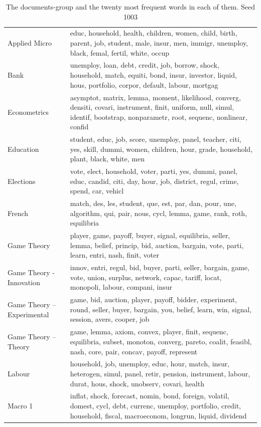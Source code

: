 \begin{table}[tb]
\caption[Groups]{The documents-group and the twenty most frequent words in each of them. Seed 1003}
\label{tab:groups}
\begin{tabularx}{\hsize}{lY}
\toprule
\midrule
Applied Micro & educ, household, health, children, women, child, birth, parent, job, student, male, insur, men, immigr, unemploy, black, femal, fertil, white, occup \\
Bank & unemploy, loan, debt, credit, job, borrow, shock, household, match, equiti, bond, insur, investor, liquid, hous, portfolio, corpor, default, labour, mortgag \\
Econometrics & asymptot, matrix, lemma, moment, likelihood, converg, densiti, covari, instrument, finit, uniform, null, simul, identif, bootstrap, nonparametr, root, sequenc, nonlinear, confid \\
Education & student, educ, job, score, unemploy, panel, teacher, citi, yes, skill, dummi, women, children, hour, grade, household, plant, black, white, men \\
Elections & vote, elect, household, voter, parti, yes, dummi, panel, educ, candid, citi, day, hour, job, district, regul, crime, spend, car, vehicl \\
French & match, des, les, student, que, est, par, dan, pour, une, algorithm, qui, pair, nous, cycl, lemma, game, rank, roth, equilibria \\
Game Theory & player, game, payoff, buyer, signal, equilibria, seller, lemma, belief, princip, bid, auction, bargain, vote, parti, learn, entri, nash, finit, voter \\
Game Theory -  Innovation & innov, entri, regul, bid, buyer, parti, seller, bargain, game, vote, union, surplus, network, capac, tariff, locat, monopoli, labour, compani, insur \\
Game Theory – Experimental & game, bid, auction, player, payoff, bidder, experiment, round, seller, buyer, bargain, you, belief, learn, win, signal, session, avers, cooper, job \\
Game Theory – Theory & game, lemma, axiom, convex, player, finit, sequenc, equilibria, subset, monoton, converg, pareto, coalit, feasibl, nash, core, pair, concav, payoff, represent \\
Labour & household, job, unemploy, educ, hour, match, insur, heterogen, simul, panel, retir, pension, instrument, labour, durat, hous, shock, unobserv, covari, health \\
Macro 1 & inflat, shock, forecast, nomin, bond, foreign, volatil, domest, cycl, debt, currenc, unemploy, portfolio, credit, household, fiscal, macroeconom, longrun, liquid, dividend \\

\end{tabularx}
\end{table}
